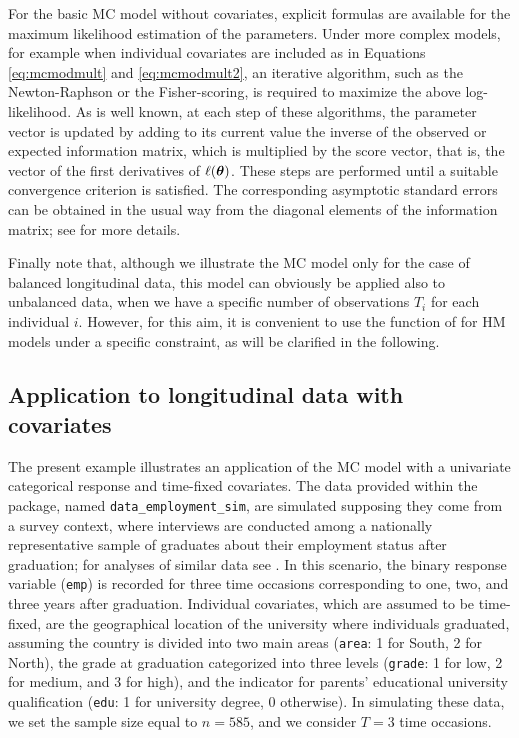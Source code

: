 For the basic MC model without covariates, explicit formulas are
available for the maximum likelihood estimation of the parameters. Under
more complex models, for example when individual covariates are included
as in Equations \eqref{eq:mcmodmult} and \eqref{eq:mcmodmult2}, an
iterative algorithm, such as the Newton-Raphson or the Fisher-scoring,
is required to maximize the above log-likelihood. As is well known, at
each step of these algorithms, the parameter vector is updated by adding
to its current value the inverse of the observed or expected information
matrix, which is multiplied by the score vector, that is, the vector of
the first derivatives of \(\ell(\mbox{\boldmath $\theta$})\). These steps are performed
until a suitable convergence criterion is satisfied. The corresponding
asymptotic standard errors can be obtained in the usual way from the
diagonal elements of the information matrix; see
\cite{bart:farc:penn:14} for more details.

Finally note that, although we illustrate the MC model only for the case
of balanced longitudinal data, this model can obviously be applied also
to unbalanced data, when we have a specific number of observations \(T_i\)
for each individual \(i\). However, for this aim, it is convenient to use
the function of  for HM models under a specific
constraint, as will be clarified in the following.

\hypertarget{subsec:MCapp}{%
\subsection{Application to longitudinal data with covariates}\label{subsec:MCapp}}

The present example illustrates an application of the MC model with a
univariate categorical response and time-fixed covariates. The data
provided within the package, named \texttt{data\_employment\_sim}, are simulated
supposing they come from a survey context, where interviews are
conducted among a nationally representative sample of graduates about
their employment status after graduation; for analyses of similar data
see \cite{bart:penn:11}. In this scenario, the binary response variable
(\texttt{emp}) is recorded for three time occasions corresponding to one, two,
and three years after graduation. Individual covariates, which are
assumed to be time-fixed, are the geographical location of the
university where individuals graduated, assuming the country is divided
into two main areas (\texttt{area}: 1 for South, 2 for North), the grade at
graduation categorized into three levels (\texttt{grade}: 1 for low, 2 for
medium, and 3 for high), and the indicator for parents' educational
university qualification (\texttt{edu}: 1 for university degree, 0 otherwise).
In simulating these data, we set the sample size equal to \(n=585\), and
we consider \(T=3\) time occasions.

